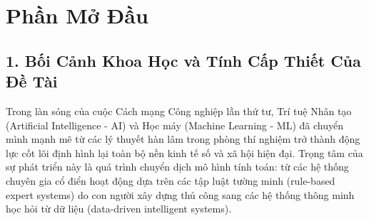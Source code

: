 \documentclass[12pt,a4paper]{report}
\begin{document}
\tableofcontents
\newpage
\listoffigures
\newpage
\listoftables
\newpage
\lstlistoflistings
\newpage

\chapter*{Phần Mở Đầu}

\section*{1. Bối Cảnh Khoa Học và Tính Cấp Thiết Của Đề Tài}

Trong làn sóng của cuộc Cách mạng Công nghiệp lần thứ tư, Trí tuệ Nhân tạo (Artificial Intelligence - AI) và Học máy (Machine Learning - ML) đã chuyển mình mạnh mẽ từ các lý thuyết hàn lâm trong phòng thí nghiệm trở thành động lực cốt lõi định hình lại toàn bộ nền kinh tế số và xã hội hiện đại. Trọng tâm của sự phát triển này là quá trình chuyển dịch mô hình tính toán: từ các hệ thống chuyên gia cổ điển hoạt động dựa trên các tập luật tường minh (rule-based expert systems) do con người xây dựng thủ công sang các hệ thống thông minh học hỏi từ dữ liệu (data-driven intelligent systems).
\end{document}
